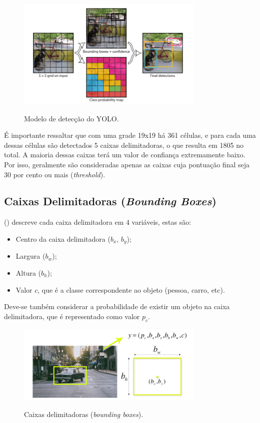 \begin{figure}[!hbtp]
  \centering
   \caption{Modelo de detecção do YOLO.}
    \includegraphics[width = 0.8\textwidth]{Caps/Figs/mat-met/YOLO-funcionamento.png}
   \label{fig:yolo-funcionamento}
\end{figure}

É importante ressaltar que com uma grade 19x19 há 361 células, e para cada uma dessas células são detectados 5 caixas delimitadoras, o que resulta em 1805 no total. A maioria dessas caixas terá um valor de confiança extremamente baixo. Por isso, geralmente são consideradas apenas as caixas cuja pontuação final seja 30 por cento ou mais (\textit{threshold}).

\subsection{Caixas Delimitadoras (\textit{Bounding Boxes})}
\label{subsec:boundingboxes}

\citeauthor{swiezewski2020} (\citeyear{swiezewski2020}) descreve cada caixa delimitadora em 4 variáveis, estas são:
\begin{itemize}
    \item Centro da caixa delimitadora ($b_x$, $b_y$);
    \item Largura ($b_w$);
    \item Altura ($b_h$);
    \item Valor $c$, que é a classe correspondente ao objeto (pessoa, carro, etc).
\end{itemize}

Deve-se também considerar a probabilidade de existir um objeto na caixa delimitadora, que é representado como valor $p_c$.

\begin{figure}[!hbtp]
  \centering
   \caption{Caixas delimitadoras (\textit{bounding boxes}).}
    \includegraphics[width = 0.8\textwidth]{Caps/Figs/mat-met/bbox-1.png}
   \label{fig:bbox1}
\end{figure}

